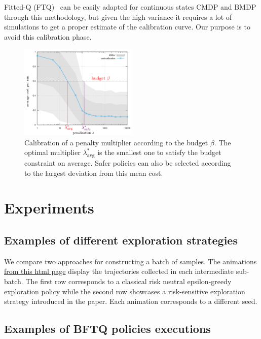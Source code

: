 Fitted-Q (FTQ)~\citep{Ernst2005,Riedmiller2005} can be easily adapted for continuous states CMDP and BMDP through this methodology, but given the high variance it requires a lot of simulations to get a proper estimate of the calibration curve. Our purpose is to avoid this calibration phase.

\begin{figure}[tp]
    \centering
    \includegraphics[width=0.5\textwidth]{source/img/CalibrationExample}
    \caption{Calibration of a penalty multiplier according to the budget $\beta$. The optimal multiplier $\lambda^*_{\text{avg}}$ is the smallest one to satisfy the budget constraint on average. Safer policies can also be selected according to the largest deviation from this mean cost.}
    \label{fig:Lagrangian}
\end{figure}


\section{Experiments}
\label{sec:exp-supp}


\subsection{Examples of different exploration strategies}
\label{subsec:exploration-examples}
We compare two approaches for constructing a batch of samples. The animations  \href{https://github.com/budgeted-rl/budgeted-rl.github.io\#risk-sensitive-exploration}{from this html page} display the trajectories collected in each intermediate sub-batch. The first row corresponds to a classical  risk neutral epsilon-greedy exploration policy while the second row showcases a risk-sensitive exploration strategy introduced in the paper. Each animation corresponds to a different seed.

\subsection{Examples of BFTQ policies executions}
\label{sec:bftq-executions}

